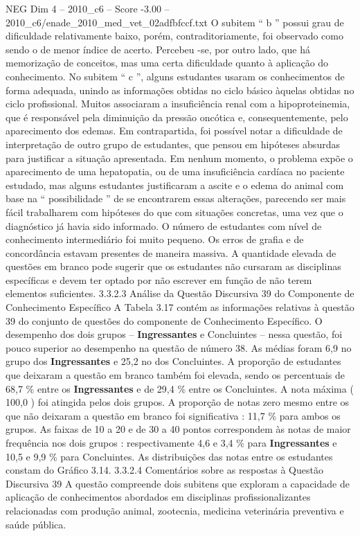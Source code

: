 \begin{textsample}{NEG Dim 4 – 2010\_c6 – Score -3.00 – 2010\_c6/enade\_2010\_med\_vet\_02adfbfccf.txt}
O subitem “ b ” possui grau de dificuldade relativamente baixo, porém, contraditoriamente, foi observado como sendo o de menor índice de acerto.
Percebeu -se, por outro lado, que há memorização de conceitos, mas uma certa dificuldade quanto à aplicação do conhecimento.
No subitem “ c ”, alguns estudantes usaram os conhecimentos de forma adequada, unindo as informações obtidas no ciclo básico àquelas obtidas no ciclo profissional.
Muitos associaram a insuficiência renal com a hipoproteinemia, que é responsável pela diminuição da pressão oncótica e, consequentemente, pelo aparecimento dos edemas.
Em contrapartida, foi possível notar a dificuldade de interpretação de outro grupo de estudantes, que pensou em hipóteses absurdas para justificar a situação apresentada.
Em nenhum momento, o problema expõe o aparecimento de uma hepatopatia, ou de uma insuficiência cardíaca no paciente estudado, mas alguns estudantes justificaram a ascite e o edema do animal com base na “ possibilidade ” de se encontrarem essas alterações, parecendo ser mais fácil trabalharem com hipóteses do que com situações concretas, uma vez que o diagnóstico já havia sido informado.
O número de estudantes com nível de conhecimento intermediário foi muito pequeno.
Os erros de grafia e de concordância estavam presentes de maneira massiva.
A quantidade elevada de questões em branco pode sugerir que os estudantes não cursaram as disciplinas específicas e devem ter optado por não escrever em função de não terem elementos suficientes. 3.3.2.3 Análise da Questão Discursiva 39 do Componente de Conhecimento Específico A Tabela 3.17 contém as informações relativas à questão 39 do conjunto de questões do componente de Conhecimento Específico.
O desempenho dos dois grupos – \textbf{Ingressantes} e Concluintes – nessa questão, foi pouco superior ao desempenho na questão de número 38.
As médias foram 6,9 no grupo dos \textbf{Ingressantes} e 25,2 no dos Concluintes.
A proporção de estudantes que deixaram a questão em branco também foi elevada, sendo os percentuais de 68,7 \% entre os \textbf{Ingressantes} e de 29,4 \% entre os Concluintes.
A nota máxima ( 100,0 ) foi atingida pelos dois grupos.
A proporção de notas zero mesmo entre os que não deixaram a questão em branco foi significativa : 11,7 \% para ambos os grupos.
As faixas de 10 a 20 e de 30 a 40 pontos correspondem às notas de maior frequência nos dois grupos : respectivamente 4,6 e 3,4 \% para \textbf{Ingressantes} e 10,5 e 9,9 \% para Concluintes.
As distribuições das notas entre os estudantes constam do Gráfico 3.14. 3.3.2.4 Comentários sobre as respostas à Questão Discursiva 39 A questão compreende dois subitens que exploram a capacidade de aplicação de conhecimentos abordados em disciplinas profissionalizantes relacionadas com produção animal, zootecnia, medicina veterinária preventiva e saúde pública.

\end{textsample}

